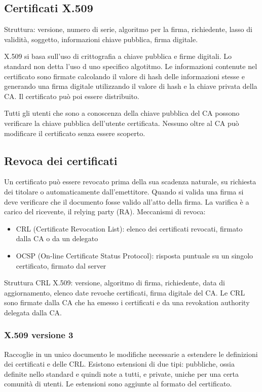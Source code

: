 \documentclass[11pt]{article}
\begin{document}
\subsection{Certificati X.509}
Struttura: versione, numero di serie, algoritmo per la firma, richiedente, lasso di validità, soggetto, informazioni chiave
pubblica, firma digitale.

X.509 si basa sull'uso di crittografia a chiave pubblica e firme digitali. Lo standard non detta l'uso d uno specifico 
algotitmo. Le informazioni contenute nel certificato sono firmate calcolando il valore di hash delle informazioni stesse 
e generando una firma digitale utilizzando il valore di hash e la chiave privata della CA. Il certificato può poi essere  
distribuito.

Tutti gli utenti che sono a conoscenza della chiave pubblica del CA possono verificare la chiave pubblica dell'utente certificata.
Nessuno oltre al CA può modificare il certificato senza essere scoperto.
\subsection{Revoca dei certificati}
Un certificato può essere revocato prima della sua scadenza naturale, su richiesta dei titolare o automaticamente dall'emettitore.
Quando si valida una firma si deve verificare che il documento fosse valido all'atto della firma. La varifica è a carico 
del ricevente, il relying party (RA).
Meccanismi di revoca:
\begin{itemize}
    \item CRL (Certificate Revocation List): elenco dei certificati revocati, firmato dalla CA o da un delegato
    \item OCSP (On-line Certificate Status Protocol): risposta puntuale su un singolo certificato, firmato dal server 
\end{itemize}
Struttura CRL X.509: versione, algoritmo di firma, richiedente, data di aggiornamento, elenco date revoche certificati, 
firma digitale del CA.
Le CRL sono firmate dalla CA che ha emesso i certificati e da una revokation authority delegata dalla CA.
\subsubsection{X.509 versione 3}
Raccoglie in un unico documento le modifiche necessarie a estendere le definizioni dei certificati e delle CRL. Esistono 
estensioni di due tipi: pubbliche, ossia definite nello standard e quindi note a tutti, e private, uniche per una certa 
comunità di utenti. Le estensioni sono aggiunte al formato del certificato.
\end{document}

